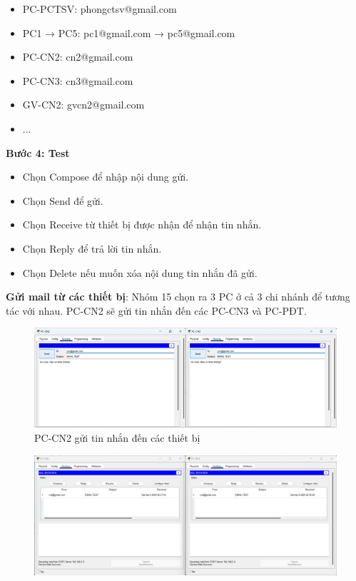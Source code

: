 \documentclass[12pt, a4paper]{article}
\begin{document}
\begin{flushleft}
\begin{itemize}[leftmargin=0.75cm]
			\item PC-PCTSV: phongctsv@gmail.com
			\item PC1 → PC5: pc1@gmail.com → pc5@gmail.com
			\item PC-CN2: cn2@gmail.com
			\item PC-CN3: cn3@gmail.com
			\item GV-CN2: gvcn2@gmail.com
			\item ...
		\end{itemize}
		\newpage
		\textbf{Bước 4: Test}
		\begin{itemize}[leftmargin=0.75cm]
			\item Chọn Compose để nhập nội dung gửi.
			\item Chọn Send để gửi.
			\item Chọn Receive từ thiết bị được nhận để nhận tin nhắn.
			\item Chọn Reply để trả lời tin nhắn. 
			\item Chọn Delete nếu muốn xóa nội dung tin nhắn đã gửi.
		\end{itemize}
		\textbf{Gửi mail từ các thiết bị}: Nhóm 15 chọn ra 3 PC ở cả 3 chi nhánh để tương tác với nhau. PC-CN2 sẽ gửi tin nhắn đến các PC-CN3 và PC-PĐT.
		\begin{figure}[H]
			\centering
			\includegraphics[width=1\textwidth]{devices_receivemail_01.png}
			\caption{PC-CN2 gửi tin nhắn đến các thiết bị}
		\end{figure}
		\begin{figure}[H]
			\centering
			\includegraphics[width=1\textwidth]{devices_receivemail_03.png}

\end{figure}
\end{flushleft}
\end{document}
